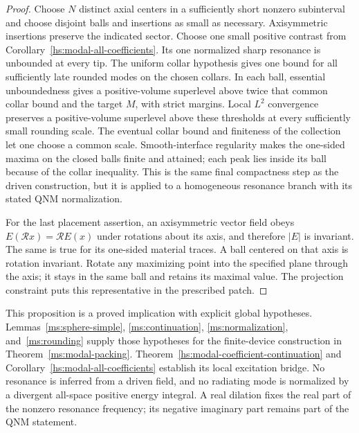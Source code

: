 \begin{proof}
Choose $N$ distinct axial centers in a sufficiently short nonzero
subinterval and choose disjoint balls and insertions as small as
necessary.  Axisymmetric insertions preserve the indicated sector.
Choose one small positive contrast from
Corollary~\ref{hs:modal-all-coefficients}.  Its one normalized sharp
resonance is unbounded at every tip.  The uniform collar hypothesis
gives one bound for all sufficiently late rounded modes on the
chosen collars.  In each ball, essential unboundedness gives a
positive-volume superlevel above twice that common collar bound and
the target $M$, with strict margins.  Local $L^2$ convergence
preserves a positive-volume superlevel above these thresholds at
every sufficiently small rounding scale.  The eventual collar bound
and finiteness of the collection let one choose a common scale.
Smooth-interface regularity
makes the one-sided maxima on the closed balls finite and attained;
each peak lies inside its ball because of the collar inequality.
This is the same final compactness step as the driven construction,
but it is applied to a homogeneous resonance branch with its stated
QNM normalization.

For the last placement assertion, an axisymmetric vector field
obeys $E(\mathcal R x)=\mathcal R E(x)$ under rotations about its
axis, and therefore $|E|$ is invariant.  The same is true for its
one-sided material traces.  A ball centered on that axis is
rotation invariant.  Rotate any maximizing point into the specified
plane through the axis; it stays in the same ball and retains its
maximal value.  The projection constraint puts this representative
in the prescribed patch.
\end{proof}

This proposition is a proved implication with explicit global
hypotheses.  Lemmas~\ref{ms:sphere-simple}, \ref{ms:continuation},
\ref{ms:normalization}, and~\ref{ms:rounding} supply those hypotheses
for the finite-device construction in Theorem~\ref{ms:modal-packing}.
Theorem~\ref{hs:modal-coefficient-continuation} and
Corollary~\ref{hs:modal-all-coefficients} establish its local
excitation bridge.  No resonance is inferred from a driven field,
and no radiating mode is normalized by a divergent all-space positive
energy integral.  A real dilation fixes the real part of the
nonzero resonance frequency; its negative imaginary part remains
part of the QNM statement.
